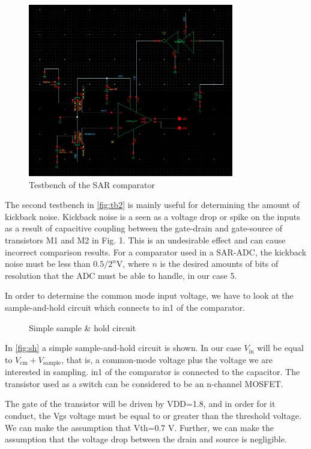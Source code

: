 \documentclass{article}
\newcommand*{\subb}[1]{\ensuremath{_{\mathrm{#1}}}}
\begin{document}
 \begin{figure}[!h]
  \centering
  \includegraphics[width=0.8\textwidth]{img/tb2}
  \caption{Testbench of the SAR comparator}
  \label{fig:tb2}
 \end{figure}

The second testbench in \autoref{fig:tb2} is mainly useful for determining the amount of kickback noise. Kickback noise is a seen as a voltage drop or spike on the inputs as a result of capacitive coupling between the gate-drain and gate-source of transistors M1 and M2 in Fig. 1. This is an undesirable effect and can cause incorrect comparison results. For a comparator used in a SAR-ADC, the kickback noise must be less than $0.5/2^n$V, where $n$ is the desired amounts of bits of resolution that the ADC must be able to handle, in our case 5.\bigskip

In order to determine the common mode input voltage, we have to look at the sample-and-hold circuit which connects to in1 of the comparator.

 \begin{figure}[!h]
  \centering
  
  \caption{Simple sample \& hold circuit}
  \label{fig:sh}
 \end{figure}
 
 In \autoref{fig:sh} a simple sample-and-hold circuit is shown. In our case $V\subb{in}$ will be equal to $V\subb{cm}+V\subb{sample}$, that is, a common-mode voltage plus the voltage we are interested in sampling. in1 of the comparator is connected to the capacitor. The transistor used as a switch can be considered to be an n-channel MOSFET.

 The gate of the transistor will be driven by VDD=1.8, and in order for it conduct, the Vgs voltage must be equal to or greater than the threshold voltage. We can make the assumption that Vth=0.7 V. Further, we can make the assumption that the voltage drop between the drain and source is negligible.
\end{document}
